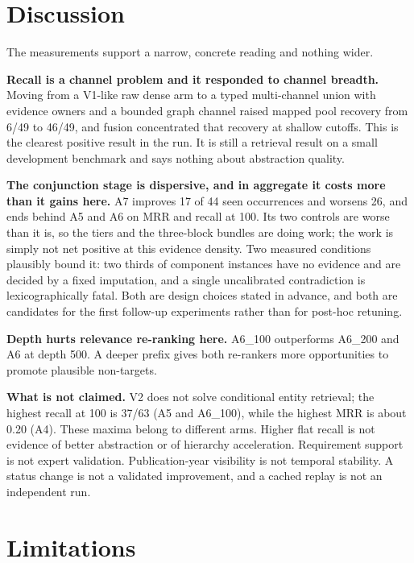 \documentclass[11pt,a4paper]{article}
\begin{document}
\section{Discussion}

The measurements support a narrow, concrete reading and nothing wider.

\textbf{Recall is a channel problem and it responded to channel breadth.} Moving from a V1-like raw dense arm to a typed multi-channel union with evidence owners and a bounded graph channel raised mapped pool recovery from 6/49 to 46/49, and fusion concentrated that recovery at shallow cutoffs. This is the clearest positive result in the run. It is still a retrieval result on a small development benchmark and says nothing about abstraction quality.

\textbf{The conjunction stage is dispersive, and in aggregate it costs more than it gains here.} A7 improves 17 of 44 seen occurrences and worsens 26, and ends behind A5 and A6 on MRR and recall at 100. Its two controls are worse than it is, so the tiers and the three-block bundles are doing work; the work is simply not net positive at this evidence density. Two measured conditions plausibly bound it: two thirds of component instances have no evidence and are decided by a fixed imputation, and a single uncalibrated contradiction is lexicographically fatal. Both are design choices stated in advance, and both are candidates for the first follow-up experiments rather than for post-hoc retuning.

\textbf{Depth hurts relevance re-ranking here.} A6\_100 outperforms A6\_200 and A6 at depth 500. A deeper prefix gives both re-rankers more opportunities to promote plausible non-targets.

\textbf{What is not claimed.} V2 does not solve conditional entity retrieval; the highest recall at 100 is 37/63 (A5 and A6\_100), while the highest MRR is about 0.20 (A4). These maxima belong to different arms. Higher flat recall is not evidence of better abstraction or of hierarchy acceleration. Requirement support is not expert validation. Publication-year visibility is not temporal stability. A status change is not a validated improvement, and a cached replay is not an independent run.

\section{Limitations}
\end{document}
